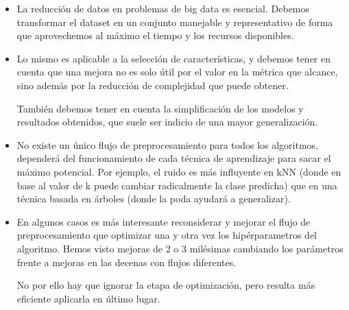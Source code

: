 \begin{itemize}
    \item La reducción de datos en problemas de big data es esencial. Debemos transformar el dataset en un conjunto manejable y representativo de forma que aprovechemos al máximo el tiempo y los recursos disponibles.
    \item Lo mismo es aplicable a la selección de características, y debemos tener en cuenta que una mejora no es solo útil por el valor en la métrica que alcance, sino además por la reducción de complejidad que puede obtener. 

    También debemos tener en cuenta la simplificación de los modelos y resultados obtenidos, que suele ser indicio de una mayor generalización.

    \item No existe un único flujo de preprocesamiento para todos los algoritmos, dependerá del funcionamiento de cada técnica de aprendizaje para sacar el máximo potencial. Por ejemplo, el ruido es más influyente en kNN (donde en base al valor de k puede cambiar radicalmente la clase predicha) que en una técnica basada en árboles (donde la poda ayudará a generalizar).
    \item En algunos casos es más interesante reconsiderar y mejorar el flujo de preprocesamiento que optimizar una y otra vez los hipérparametros del algoritmo. Hemos visto mejoras de 2 o 3 milésimas cambiando los parámetros frente a mejoras en las decenas con flujos diferentes.
    
    No por ello hay que ignorar la etapa de optimización, pero resulta más eficiente aplicarla en último lugar.
\end{itemize}